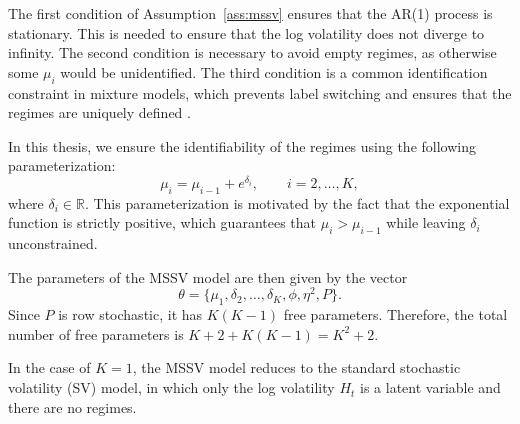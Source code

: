 The first condition of Assumption~\ref{ass:mssv} ensures that the AR(1) process is stationary. This is needed to ensure that the log volatility does not diverge to infinity. The second condition is necessary to avoid empty regimes, as otherwise some $\mu_i$ would be unidentified.
The third condition is a common identification constraint in mixture models, which prevents label switching and ensures that the regimes are uniquely defined \cite{so1998stochastic}. 

In this thesis, we ensure the identifiability of the regimes using the following parameterization:
\begin{equation}
    \mu_i = \mu_{i-1} + e^{\delta_i}, \qquad i = 2, \ldots, K,
\end{equation}
where $\delta_i \in \mathbb{R}$. This parameterization is motivated by the fact that the exponential function is strictly positive, which guarantees that $\mu_i > \mu_{i-1}$ while leaving $\delta_i$ unconstrained. 

The parameters of the MSSV model are then given by the vector
\begin{equation}
    \theta = \{\mu_1, \delta_2, \ldots, \delta_K, \phi, \eta^2, P\}.
\end{equation}
Since $P$ is row stochastic, it has $K(K-1)$ free parameters. Therefore, the total number of free parameters is $K + 2 + K(K-1) = K^2 + 2$.

\begin{remark}
    In the case of $K=1$, the MSSV model reduces to the standard stochastic volatility (SV) model, in which only the log volatility $H_t$ is a latent variable and there are no regimes.
\end{remark}

